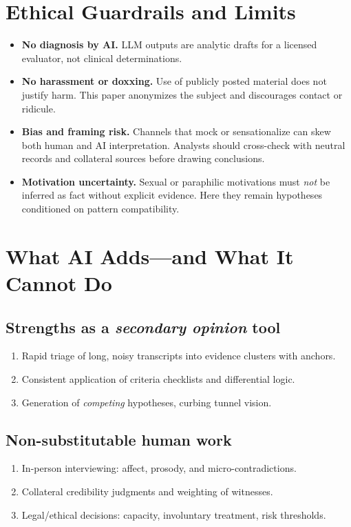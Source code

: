 \documentclass[12pt]{article}
\begin{document}
\section{Ethical Guardrails and Limits}\label{sec:ethics}
\begin{itemize}[leftmargin=2em]
  \item \textbf{No diagnosis by AI.} LLM outputs are analytic drafts for a licensed evaluator, not clinical determinations.
  \item \textbf{No harassment or doxxing.} Use of publicly posted material does not justify harm. This paper anonymizes the subject and discourages contact or ridicule.
  \item \textbf{Bias and framing risk.} Channels that mock or sensationalize can skew both human and AI interpretation. Analysts should cross-check with neutral records and collateral sources before drawing conclusions.
  \item \textbf{Motivation uncertainty.} Sexual or paraphilic motivations must \emph{not} be inferred as fact without explicit evidence. Here they remain hypotheses conditioned on pattern compatibility.
\end{itemize}

\section{What AI Adds---and What It Cannot Do}
\subsection{Strengths as a \emph{secondary opinion} tool}
\begin{enumerate}[leftmargin=2em]
  \item Rapid triage of long, noisy transcripts into evidence clusters with anchors.
  \item Consistent application of criteria checklists and differential logic.
  \item Generation of \emph{competing} hypotheses, curbing tunnel vision.
\end{enumerate}

\subsection{Non-substitutable human work}
\begin{enumerate}[leftmargin=2em]
  \item In-person interviewing: affect, prosody, and micro-contradictions.
  \item Collateral credibility judgments and weighting of witnesses.
  \item Legal/ethical decisions: capacity, involuntary treatment, risk thresholds.
\end{enumerate}
\end{document}
